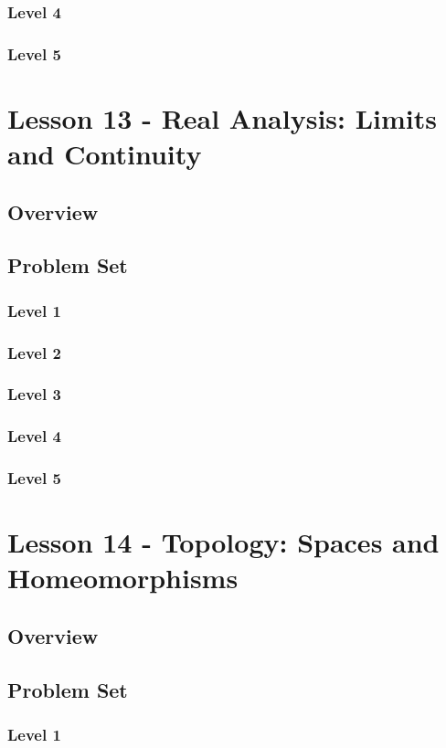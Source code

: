\documentclass{article}
\begin{document}
\subsubsection{Level 4}
\subsubsection{Level 5}
\pagebreak

\section{Lesson 13 - Real Analysis: Limits and Continuity}
\subsection{Overview}
\subsection{Problem Set}
\subsubsection{Level 1}
\subsubsection{Level 2}
\subsubsection{Level 3}
\subsubsection{Level 4}
\subsubsection{Level 5}
\pagebreak

\section{Lesson 14 - Topology: Spaces and Homeomorphisms}
\subsection{Overview}
\subsection{Problem Set}
\subsubsection{Level 1}
\end{document}
